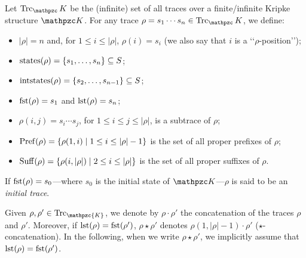 Let $\Trk_\Ku$ be the (infinite) set of all traces over a finite/infinite Kripke structure $\Ku$. For any trace $\rho=s_1\cdots s_n \in \Trk_\Ku$, we define:
\begin{itemize}
    \item $|\rho|=n$ and, for $1\leq i\leq |\rho|$, $\rho(i)=s_i$ (we also say that $i$ is a \lq\lq $\rho$-position\rq\rq );
    \item $\operatorname{states}(\rho)=\{s_1,\ldots,s_n\}\subseteq S$;
    \item $\operatorname{intstates}(\rho)=\{s_2,\ldots,s_{n-1}\}\subseteq S$;
    \item $\operatorname{fst}(\rho)=s_1$ and $\operatorname{lst}(\rho)=s_n$;
    \item $\rho(i,j)=s_i\cdots s_j$, for $1\leq i \leq j\leq |\rho|$, is a subtrace of $\rho$;
    \item $\operatorname{Pref}(\rho)=\{\rho(1,i) \mid 1\leq i\leq |\rho|-1\}$ is the set of all proper prefixes of $\rho$;
    \item $\operatorname{Suff}(\rho)=\{\rho(i,|\rho|) \mid 2\leq i\leq |\rho|\}$ is the set of all proper suffixes of $\rho$. 
\end{itemize}
If $\operatorname{fst}(\rho)=s_0$---where $s_0$ is the initial state of $\Ku$---$\rho$ is said to be an \emph{initial trace}. 

Given $\rho,\rho' \in \Trk_\mathpzc{K}$, we denote by $\rho\cdot\rho'$ the concatenation of the traces $\rho$ and $\rho'$.
Moreover, if $\operatorname{lst}(\rho)=\operatorname{fst}(\rho')$, $\rho\star \rho'$ denotes $\rho(1,|\rho|-1)\cdot \rho'$ ($\star$-concatenation). In the following, when we write $\rho\star\rho'$, we implicitly assume that
$\operatorname{lst}(\rho)=\operatorname{fst}(\rho')$.

